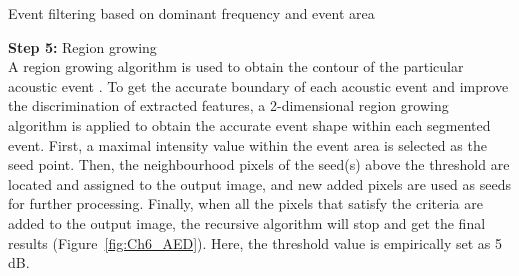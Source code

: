 \begin{algorithm}
\DontPrintSemicolon
{}

\caption{Event filtering based on dominant frequency and event area}
\end{algorithm}




\noindent \textbf{Step 5:} Region growing
\\
A region growing algorithm is used to obtain the contour of the particular acoustic event \cite{mallawaarachchi2008spectrogram}. To get the accurate boundary of each acoustic event and improve the discrimination of extracted features, a 2-dimensional region growing algorithm is applied to obtain the accurate event shape within each segmented event. First, a maximal intensity value within the event area is selected as the seed point. Then, the neighbourhood pixels of the seed(s) above the threshold are located and assigned to the output image, and new added pixels are used as seeds for further processing. Finally, when all the pixels that satisfy the criteria are added to the output image, the recursive algorithm will stop and get the final results (Figure~\ref{fig:Ch6_AED}). Here, the threshold value is empirically set as 5 dB.

